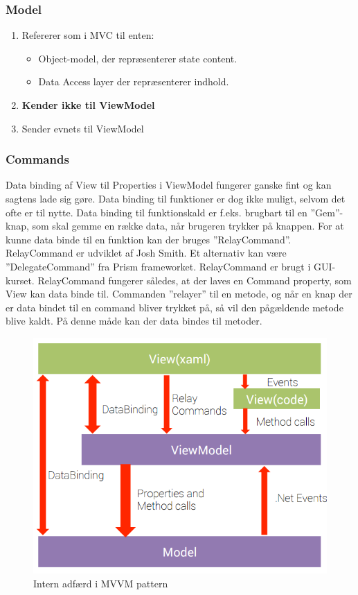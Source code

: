 \subsubsection{Model}
\begin{enumerate}
	\item Refererer som i MVC til enten:
	\begin{itemize}
		\item Object-model, der repræsenterer state content.
		\item Data Access layer der repræsenterer indhold.
	\end{itemize}
	\item \textbf{Kender ikke til ViewModel}
	\item Sender evnets til ViewModel
\end{enumerate}

\subsubsection{Commands}
Data binding af View til Properties i ViewModel fungerer ganske fint og kan sagtens lade sig gøre. Data binding til funktioner er dog ikke muligt, selvom det ofte er til nytte. Data binding til funktionskald er f.eks. brugbart til en ”Gem”-knap, som skal gemme en række data, når brugeren trykker på knappen.
For at kunne data binde til en funktion kan der bruges ”RelayCommand”. RelayCommand er udviklet af Josh Smith. Et alternativ kan være ”DelegateCommand” fra Prism frameworket. RelayCommand er brugt i GUI-kurset.
RelayCommand fungerer således, at der laves en Command property, som View kan data binde til. Commanden ”relayer” til en metode, og når en knap der er data bindet til en command bliver trykket på, så vil den pågældende metode blive kaldt. På denne måde kan der data bindes til metoder.

\begin{figure}[H]
\centering
\includegraphics[width=0.7\linewidth]{figs/MVVM/mvvmPatternComplex}
\caption{Intern adfærd i MVVM pattern}
\label{fig:mvvmPatternComplex}
\end{figure}


